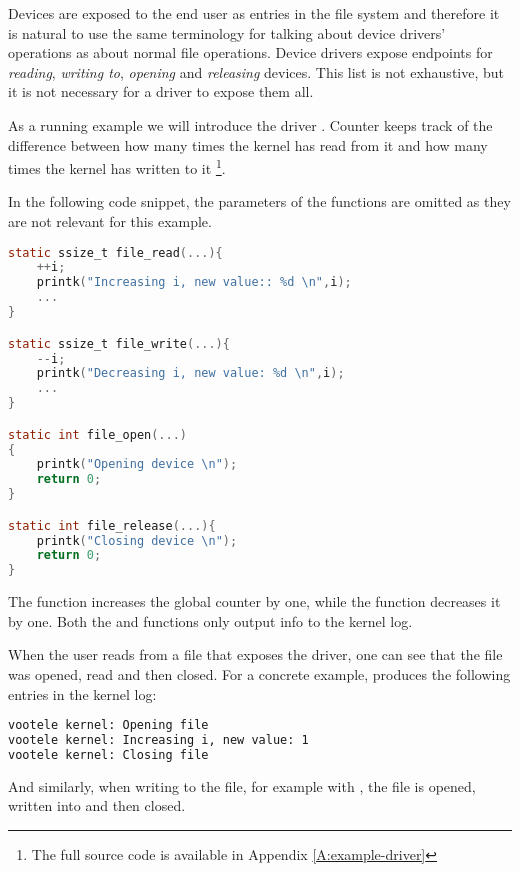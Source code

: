 \documentclass[..thesis.tex]{subfiles}
\begin{document}
Devices are exposed to the end user as entries in the file system and therefore it is natural
to use the same terminology for talking about device drivers' operations as about normal file operations.
Device drivers expose endpoints for \textit{reading}, \textit{writing to}, \textit{opening} and \textit{releasing} devices.
This list is not exhaustive\cite[include/linux/fs.h]{torvalds_linux}, but it is not necessary for a driver to expose them all.

As a running example we will introduce the driver .
Counter keeps track of the difference between how many times the kernel has read from it and how many times the kernel has written to it
\footnote{The full source code is available in Appendix \ref{A:example-driver}}.

In the following code snippet, the parameters of the functions are omitted as they are not relevant for this example.



\begin{lstlisting}[language=C,style=def]
static ssize_t file_read(...){
    ++i;
    printk("Increasing i, new value:: %d \n",i);
    ...
}

static ssize_t file_write(...){
    --i;
    printk("Decreasing i, new value: %d \n",i);
    ...
}

static int file_open(...)
{
    printk("Opening device \n");
    return 0;
}

static int file_release(...){
    printk("Closing device \n");
    return 0;
}


\end{lstlisting}

The  function increases the global counter by one, while the  function decreases it by one.
Both the  and  functions only output info to the kernel log.

When the user reads from a file that exposes the driver, one can see that the file was opened, read and then closed. For a concrete example,
 produces the following entries in the kernel log:

\begin{lstlisting}[language=sh,style=def]
vootele kernel: Opening file 
vootele kernel: Increasing i, new value: 1 
vootele kernel: Closing file 
\end{lstlisting}

And similarly, when writing to the file, for example with , the file is opened, written into and then closed.
\end{document}
